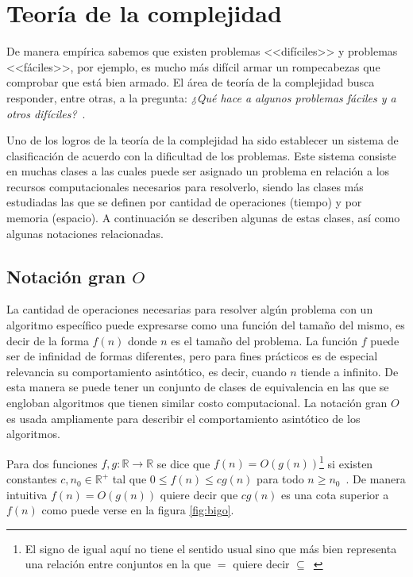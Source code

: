 \section{Teoría de la complejidad}
De manera empírica sabemos que existen problemas <<difíciles>> y problemas <<fáciles>>, por ejemplo, es mucho más difícil armar un 
rompecabezas que comprobar que está bien armado. 
%
El área de teoría de la complejidad busca responder, entre otras, a la pregunta: \textit{¿Qué hace a algunos problemas fáciles y a 
otros difíciles?}~\cite{sipser1996introduction}. 

Uno de los logros de la teoría de la complejidad ha sido establecer un sistema de clasificación de acuerdo con la dificultad de los problemas. 
%
Este sistema consiste en muchas clases a las cuales puede ser asignado un problema en relación a los recursos computacionales necesarios para resolverlo, 
siendo las clases más estudiadas las que se definen por cantidad de operaciones (tiempo) y por memoria (espacio). 
%
A continuación se describen algunas de estas clases, así como algunas notaciones relacionadas. 

\subsection*{Notación gran $O$}
La cantidad de operaciones necesarias para resolver algún problema con un algoritmo específico puede expresarse como una función del tamaño del mismo, 
es decir de la forma $f(n)$ donde $n$ es el tamaño del problema. 
%
La función $f$ puede ser de infinidad de formas diferentes, pero para fines prácticos es de especial relevancia su comportamiento asintótico, es decir, 
cuando $n$ tiende a infinito. 
%
De esta manera se puede tener un conjunto de clases de equivalencia en las que se engloban algoritmos que tienen similar costo computacional.
%
La notación gran $O$ es usada ampliamente para describir el comportamiento asintótico de los algoritmos.

Para dos funciones $f,g:\mathbb{R}\rightarrow\mathbb{R}$ se dice que 
$f(n)= O(g(n))$\footnote{El signo de igual aquí no tiene el sentido usual sino que más bien representa una relación entre conjuntos en la que $=$ 
quiere decir $\subseteq$~\cite{graham1989concrete}} si existen constantes $c,n_0\in\mathbb{R}^+$ tal que $0\leq f(n)\leq cg(n)$ para todo 
$n\geq n_0$~\cite{cormen2009introduction}.
%
De manera intuitiva $f(n)=O(g(n))$ quiere decir que $cg(n)$ es una cota superior a $f(n)$ como puede verse en la figura \ref{fig:bigo}.

